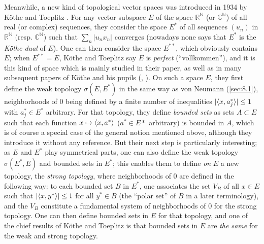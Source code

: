 \documentclass[12pt,a4paper,leqno,twoside]{extbook}
\DeclarePairedDelimiter{\ip}{\langle}{\rangle}
\newcommand{\C}{\mathbb{C}}
\newcommand{\R}{\mathbb{R}}
\newcommand{\N}{\mathbb{N}}
\begin{document}
Meanwhile, a new kind of topological vector spaces was introduced in 1934 by Köthe and Toeplitz \cite{129}. For any vector subspace \(E\) of the space \(\R^{\N}\) (or \(\C^{\N}\)) of all real (or complex) sequences, they consider the space \(E^*\) of all sequences \((u_n)\) in \(\R^{\N}\) (resp. \(\C^{\N}\)) such that \(\sum\limits_n |u_n x_n|\) converges (nowadays none says that \(E^*\) is the \emph{Köthe dual} of \(E\)). One can then consider the space \(E^{**}\), which obviously contains \(E\); when \(E^{**} = E\), Köthe and Toeplitz say \(E\) is \emph{perfect} (``vollkommen''), and it is this kind of space which is mainly studied in their paper, as well as in many subsequent papers of Köthe and his pupils (\cite{128}, \cite{130}). On such a space \(E\), they first define the weak topology \(\sigma(E,E^*)\) in the same way as von Neumann (\ref{sec:8.1}), neighborhoods of 0 being defined by a finite number of inequalities \(|\ip{x, a^*_j}| \leq 1\) with \(a^*_j \in E^*\) arbitrary. For that topology, they define \emph{bounded sets} as sets \(A \subset E\) such that each function \(x \mapsto \ip{x,a^*}\) (\(a^* \in E*\) arbitrary) is bounded in \(A\), which is of course a special case of the general notion mentioned above, although they introduce it without any reference. But their next step is particularly interesting; as \(E\) and \(E^*\) play symmetrical parts, one can also define the weak topology \(\sigma(E^*,E)\) and bounded sets in \(E^*\); this enables them to define \emph{on} \(E\) a new topology, the \emph{strong topology}, where neighborhoods of 0 are defined in the following way: to each bounded set \(B\) in \(E^*\), one associates the set \(V_B\) of all \(x \in E\) such that \(|\ip{x,y^*}| \leq 1\) for all \(y^* \in B\) (the ``polar set'' of \(B\) in a later terminology), and the \(V_B\) constitute a fundamental system of neighborhoods of 0 for the strong topology. One can then define bounded sets in \(E\) for that topology, and one of the chief results of Köthe and Toeplitz is that bounded sets in \(E\) are \emph{the same} for the weak and strong topology.
\end{document}
